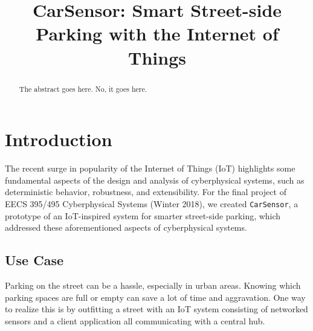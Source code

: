 \documentclass[conference]{IEEEtran}
\begin{document}
\title{CarSensor: Smart Street-side Parking with the Internet of Things}


\author{
	\and
	}
	
\maketitle

\begin{abstract}
	The abstract goes here.
	No, it goes here.
\end{abstract}

\section{Introduction}
The recent surge in popularity of the Internet of Things (IoT) highlights some fundamental aspects of the design and analysis of cyberphysical systems, such as deterministic behavior, robustness, and extensibility. For the final project of EECS 395/495 Cyberphysical Systems (Winter 2018), we created \texttt{CarSensor}, a prototype of an IoT-inspired system for smarter street-side parking, which addressed these aforementioned aspects of cyberphysical systems.

\subsection{Use Case}
Parking on the street can be a hassle, especially in urban areas. Knowing which parking spaces are full or empty can save a lot of time and aggravation. One way to realize this is by outfitting a street with an IoT system consisting of networked sensors and a client application all communicating with a central hub.
\end{document}
